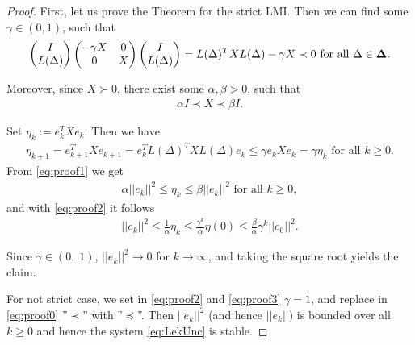 \begin{proof}
	First, let us prove the Theorem for the strict LMI. Then we can find some $\gamma \in (0,1)$, such that
	\begin{align}
	\label{eq:proof0}
	\begin{pmatrix}
	I \\ L(\Delta)
	\end{pmatrix}
	\begin{pmatrix}
	-\gamma X & 0 \\ 0 & X
	\end{pmatrix}
	\begin{pmatrix}
	I \\ L(\Delta)
	\end{pmatrix} = L(\Delta)^T X L(\Delta) - \gamma X \prec 0 \text{ for all } \Delta \in \mathbf{\Delta}.
	\end{align}	
	

	Moreover, since $X \succ 0$, there exist some $\alpha, \beta > 0$, such that 
	\begin{align}
	\label{eq:proof1}
	\alpha I \prec X \prec \beta I.
	\end{align}
	
	Set $\eta_k := e_k^T X e_k$. Then we have
	\begin{align}
	\label{eq:proof2}
	\eta_{k+1} = e_{k+1}^T X e_{k+1} = e_k^T L(\Delta)^T X L(\Delta) e_k \leq \gamma e_k X e_k = \gamma \eta_k \text{ for all } k\geq 0.
	\end{align}
    From \eqref{eq:proof1} we get
	\begin{align}
	\alpha || e_k ||^2 \leq \eta_k \leq \beta ||e_k||^2 \text{ for all } k\geq 0,
	\end{align}
	and with \eqref{eq:proof2} it follows
	\begin{align}
	\label{eq:proof3}
	||e_k||^2 \leq \frac{1}{\alpha}\eta_k \leq \frac{\gamma^k}{\alpha}\eta(0) \leq \frac{\beta}{\alpha} \gamma^k ||e_0||^2. 
	\end{align}
	
	
	Since $\gamma \in (0,\;1)$, $||e_k||^2 \to 0$ for $k \to \infty$, and taking the square root yields the claim. 
	
	For not strict case, we set in \eqref{eq:proof2} and \eqref{eq:proof3} $\gamma = 1$, and replace in \eqref{eq:proof0} ''$\prec$'' with ''$\preceq$''. Then $||e_k||^2$ (and hence $||e_k||$) is bounded over all $k\geq 0$ and hence the system \eqref{eq:LekUnc} is stable. 
	
\end{proof}

